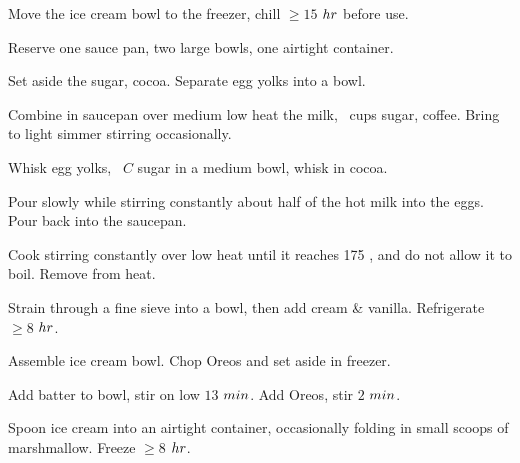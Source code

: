 \begin{preparation}
\item Move the ice cream bowl to the freezer, chill $\ge15$ $\hour$ before use.

\item Reserve one sauce pan, two large bowls, one airtight container.

\item Set aside the sugar, cocoa.
	Separate egg yolks into a bowl.

\item Combine in saucepan over medium low heat the milk, \onehalf~cups sugar, coffee.
	Bring to light simmer stirring occasionally.

\item Whisk egg yolks, \onefourth~$C$ sugar in a medium bowl, whisk in cocoa.

\item Pour slowly while stirring constantly about half of the hot milk into the eggs.
	Pour back into the saucepan.

\item Cook stirring constantly over low heat until it reaches 175 \Fahrenheit, and do not allow it to boil.
	Remove from heat.

\item Strain through a fine sieve into a bowl, then add cream \& vanilla.
	Refrigerate $\ge8$ $\hour$.

\item Assemble ice cream bowl.
	Chop Oreos and set aside in freezer.

\item Add batter to bowl, stir on low $13$ $\minute$.
	Add Oreos, stir $2$ $\minute$.

\item Spoon ice cream into an airtight container, occasionally folding in small scoops of marshmallow.
	Freeze $\ge8$ $\hour$.
\end{preparation}


\recipeend%
